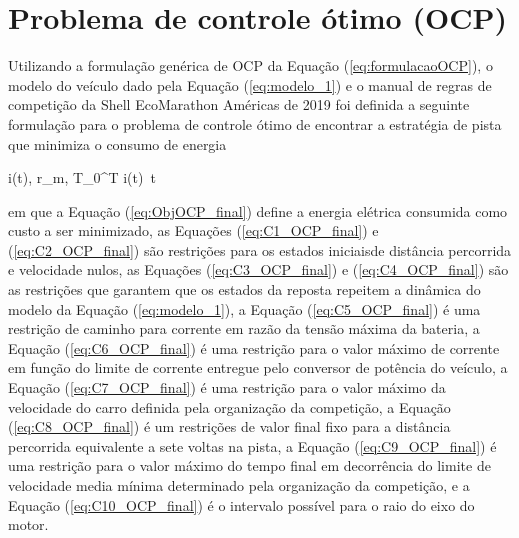 \section{Problema de controle ótimo (OCP)}
\label{sec:OCPporposto}

Utilizando a formulação genérica de OCP da Equação (\ref{eq:formulacaoOCP}), o modelo do veículo dado pela Equação (\ref{eq:modelo_1})
e o manual de regras de competição da Shell EcoMarathon Américas de 2019 
foi definida a seguinte formulação para o problema de controle ótimo de encontrar a estratégia de pista que minimiza o consumo de energia

\begin{mini!}
	{i(t), r_m, T}{\int_{0}^{T} i(t)  \,t \label{eq:ObjOCP_final}}
	{\label{eq:formulacaoOCP_final}}{}
\end{mini!}

em que a Equação (\ref{eq:ObjOCP_final}) define a energia elétrica consumida como custo a ser minimizado, 
as Equações (\ref{eq:C1_OCP_final}) e (\ref{eq:C2_OCP_final}) são restrições para os estados iniciaisde distância  percorrida e velocidade nulos, 
as Equações (\ref{eq:C3_OCP_final}) e (\ref{eq:C4_OCP_final}) são as restrições que garantem que os estados da reposta repeitem a dinâmica do modelo da Equação (\ref{eq:modelo_1}), 
a Equação (\ref{eq:C5_OCP_final}) é uma restrição de caminho para corrente em razão da tensão máxima da bateria, 
a Equação (\ref{eq:C6_OCP_final}) é uma restrição para o valor máximo de corrente em função do limite de corrente entregue pelo conversor de potência do veículo,
a Equação (\ref{eq:C7_OCP_final}) é uma restrição para o valor máximo da velocidade do carro definida pela organização da competição,
a Equação (\ref{eq:C8_OCP_final}) é um restrições de valor final fixo para a distância  percorrida equivalente a sete voltas na pista,
a Equação (\ref{eq:C9_OCP_final}) é uma restrição para o valor máximo do tempo final em decorrência do limite de velocidade media mínima determinado pela organização da competição,
e a Equação (\ref{eq:C10_OCP_final}) é o intervalo possível para o raio do eixo do motor.


